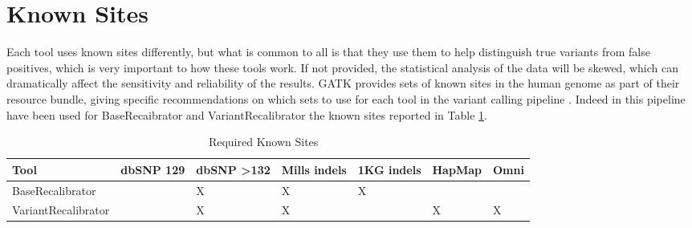 \section{Known Sites}
Each tool uses known sites differently, but what is common to all is that they use them to help distinguish true variants from false positives, which is very important to how these tools work. If not provided, the statistical analysis of the data will be skewed, which can dramatically affect the sensitivity and reliability of the results. GATK provides sets of known sites in the human genome as part of their resource bundle, giving specific recommendations on which sets to use for each tool in the variant calling pipeline \cite{known_sites}. Indeed in this pipeline have been used for BaseRecaibrator and VariantRecalibrator the known sites reported in Table \ref{known_sites}.
\begin{table}[h]
	\caption{Required Known Sites ~\label{known_sites}}
	\begin{center}
		\begin{tabular}{| l | l | l | l | l | l | l |}
    		\hline
    		Tool	&	dbSNP 129	&	dbSNP >132	&	Mills indels	&	1KG indels	&	HapMap	&	Omni \\ \hline
            BaseRecalibrator	&	 	&	X	&	X	&	X	&	 	&	  \\ \hline
            VariantRecalibrator	&	 	&	X	&	X	&	 	&	X	&	X \\ \hline
    	\end{tabular}
    \end{center}
\end{table}
\\[1\baselineskip]

